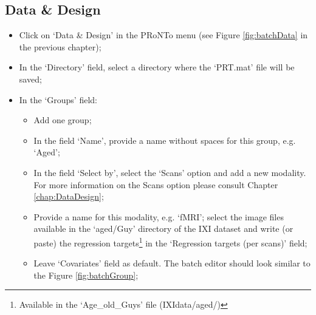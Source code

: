 \subsection{Data \& Design}
\begin{itemize}

    \item Click on `Data \& Design' in the PRoNTo menu (see Figure \ref{fig:batchData} in the previous chapter);
    
    \item In the `Directory' field, select a directory where the `PRT.mat' file will be saved;
    
    \item In the `Groups' field:
 	
		\begin{itemize}
		
		\item Add one group;
		
		\item In the field `Name', provide a name without spaces for this group, e.g. `Aged';

    	\item In the field `Select by', select the `Scans' option and add a new modality. For more information on the Scans option please consult Chapter \ref{chap:DataDesign};	
        	
    	\item Provide a name for this modality, e.g. `fMRI'; select the image files available in the `aged/Guy' directory of the IXI dataset and write (or paste) the regression targets\footnote{Available in the `Age\_old\_Guys' file (IXIdata/aged/)} in the `Regression targets (per scans)' field;
    	
    	\item Leave `Covariates' field as default. The batch editor should look similar to the Figure \ref{fig:batchGroup};


\end{itemize}
\end{itemize}
